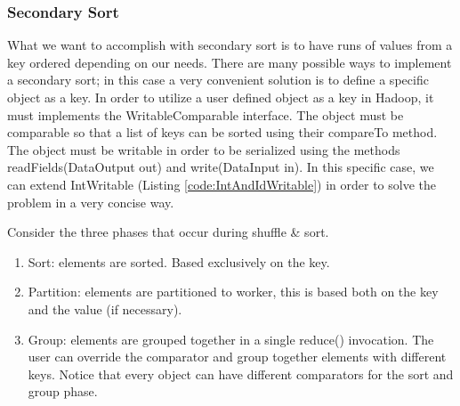 \documentclass[a4paper,12pt]{article}
\begin{document}
\subsubsection{Secondary Sort}
\label{sec:secondary}


What we want to accomplish with secondary sort is to have runs of values from a key ordered depending on our needs.
There are many possible ways to implement a secondary sort; in this case a very convenient solution is to define a specific object as a key.
In order to utilize a user defined object as a key in Hadoop, it must implements the WritableComparable interface.
The object must be comparable so that a list of keys can be sorted using their compareTo method. 
The object must be writable in order to be serialized using the methods readFields(DataOutput out) and write(DataInput in). 
In this specific case, we can extend IntWritable (Listing \ref{code:IntAndIdWritable}) in order to solve the problem in a very concise way.

Consider the three phases that occur during shuffle \& sort.
\begin{enumerate}
\item Sort: elements are sorted. Based exclusively on the key.
\item Partition: elements are partitioned to worker, this is based both on the key and the value (if necessary).
\item Group: elements are grouped together in a single reduce() invocation. 
The user can override the comparator and group together elements with different keys. Notice that every object can have different comparators for the sort and group phase.
\end{enumerate}
\end{document}
